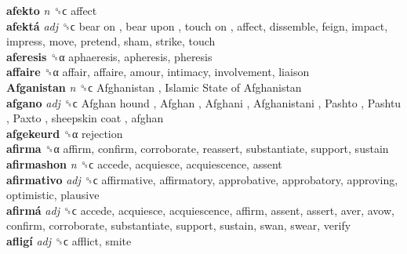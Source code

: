 \textbf{afekto} \emph{n}  ␝ϲ  affect  \\
\textbf{afektá} \emph{adj}  ␝ϲ   bear on ,  bear upon ,  touch on , affect, dissemble, feign, impact, impress, move, pretend, sham, strike, touch  \\
\textbf{aferesis} ␝α  aphaeresis, apheresis, pheresis  \\
\textbf{affaire} ␝α  affair, affaire, amour, intimacy, involvement, liaison  \\
\textbf{Afganistan} \emph{n}  ␝ϲ   Afghanistan ,  Islamic State of Afghanistan   \\
\textbf{afgano} \emph{adj}  ␝ϲ   Afghan hound ,  Afghan ,  Afghani ,  Afghanistani ,  Pashto ,  Pashtu ,  Paxto ,  sheepskin coat , afghan  \\
\textbf{afgekeurd} ␝α  rejection  \\
\textbf{afirma} ␝α  affirm, confirm, corroborate, reassert, substantiate, support, sustain  \\
\textbf{afirmashon} \emph{n}  ␝ϲ  accede, acquiesce, acquiescence, assent  \\
\textbf{afirmativo} \emph{adj}  ␝ϲ  affirmative, affirmatory, approbative, approbatory, approving, optimistic, plausive  \\
\textbf{afirmá} \emph{adj}  ␝ϲ  accede, acquiesce, acquiescence, affirm, assent, assert, aver, avow, confirm, corroborate, substantiate, support, sustain, swan, swear, verify  \\
\textbf{afligí} \emph{adj}  ␝ϲ  afflict, smite  \\
